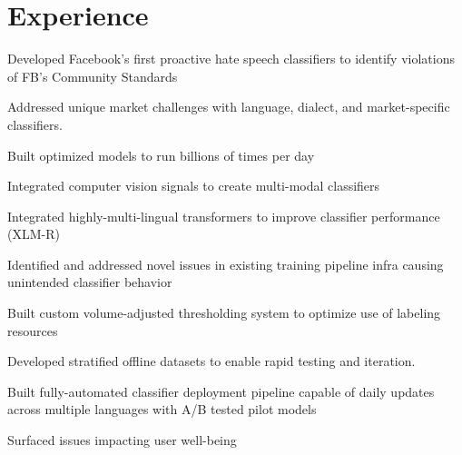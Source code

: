 \documentclass[]{resume}
\begin{document}
\begin{minipage}[t]{0.64\textwidth}



\section{Experience}



\sectionsep

\vspace{\topsep} %
\begin{tightemize}
\item Developed Facebook's first proactive hate speech classifiers to identify violations of
FB's Community Standards
\item Addressed unique market challenges with language, dialect, and market-specific classifiers.
\item Built optimized models to run billions of times per day
\item Integrated computer vision signals to create multi-modal classifiers
\item Integrated highly-multi-lingual transformers to improve classifier performance (XLM-R)
\item Identified and addressed novel issues in existing training pipeline infra causing unintended classifier behavior
\item Built custom volume-adjusted thresholding system to optimize use of labeling resources
\item Developed stratified offline datasets to enable rapid testing and iteration.
\item Built fully-automated classifier deployment pipeline capable of daily updates 
across multiple languages with A/B tested pilot models
\item Surfaced issues impacting user well-being
\end{tightemize}

\sectionsep


\end{minipage}
\end{document}
